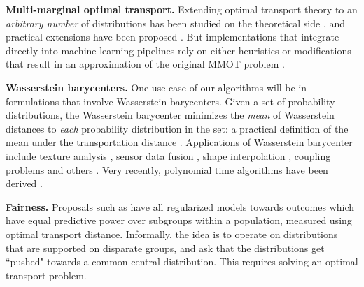 \textbf{Multi-marginal optimal transport.}
Extending optimal transport theory to an {\em arbitrary number} of distributions has been 
studied on the theoretical side \citep{pass2015multi}, and practical extensions have been proposed \citep{mmotcuturi}. But implementations that integrate directly into machine learning pipelines rely on either heuristics or modifications that result in an approximation of the original MMOT problem \citep{cao2019multi}.

\textbf{Wasserstein barycenters.}
One use case of our algorithms will be in 
formulations that involve Wasserstein barycenters. 
Given a set of probability distributions, the Wasserstein barycenter minimizes 
the {\em mean} of Wasserstein
distances to {\em each} probability distribution in the set: a practical definition of the mean under the transportation distance  \citep{sinkbaryfw,fastbary,agueh2011barycenters,janati2020debiased}. 
Applications of Wasserstein barycenter  
include texture analysis \citep{rabin2011wasserstein}, sensor data fusion \citep{elvander2020multi}, shape interpolation \citep{solomon2015convolutional}, coupling problems \citep{ruschendorf2002n} and others \citep{ho2017multilevel}. Very recently, polynomial time algorithms have been derived  \citep{altschuler2021wasserstein}. 

\textbf{Fairness.}
Proposals such as 
\citep{jiang2020wasserstein,fairregress,gordaliza2019obtaining} have all 
regularized models towards outcomes which have equal predictive power over subgroups within a population, measured using optimal transport distance.  
Informally, the idea is to operate on 
distributions that are supported on disparate groups, and 
ask that the distributions get ``pushed" towards 
a common central distribution. This requires solving an optimal transport problem.

